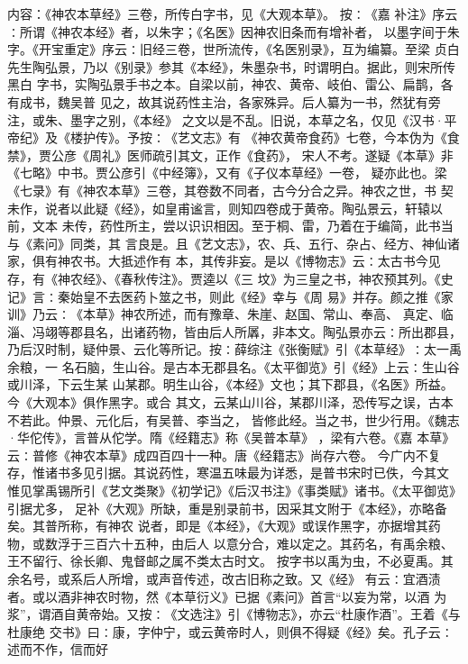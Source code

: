 \documentclass[12pt,UTF8]{ctexbook}
\begin{document}
内容：《神农本草经》三卷，所传白字书，见《大观本草》。 
按∶《嘉 补注》序云∶所谓《神农本经》者，以朱字；《名医》因神农旧条而有增补者， 
以墨字间于朱字。《开宝重定》序云∶旧经三卷，世所流传，《名医别录》，互为编纂。至梁 
贞白先生陶弘景，乃以《别录》参其《本经》，朱墨杂书，时谓明白。据此，则宋所传黑白 
字书，实陶弘景手书之本。自梁以前，神农、黄帝、岐伯、雷公、扁鹊，各有成书，魏吴普 
见之，故其说药性主治，各家殊异。后人纂为一书，然犹有旁注，或朱、墨字之别，《本经》 
之文以是不乱。旧说，本草之名，仅见《汉书·平帝纪》及《楼护传》。予按∶《艺文志》有 
《神农黄帝食药》七卷，今本伪为《食禁》，贾公彦《周礼》医师疏引其文，正作《食药》， 
宋人不考。遂疑《本草》非《七略》中书。贾公彦引《中经簿》，又有《子仪本草经》一卷， 
疑亦此也。梁《七录》有《神农本草》三卷，其卷数不同者，古今分合之异。神农之世，书 
契未作，说者以此疑《经》，如皇甫谧言，则知四卷成于黄帝。陶弘景云，轩辕以前，文本 
未传，药性所主，尝以识识相因。至于桐、雷，乃着在于编简，此书当与《素问》同类，其 
言良是。且《艺文志》，农、兵、五行、杂占、经方、神仙诸家，俱有神农书。大抵述作有 
本，其传非妄。是以《博物志》云∶太古书今见存，有《神农经》、《春秋传注》。贾逵以《三 
坟》为三皇之书，神农预其列。《史记》言∶秦始皇不去医药卜筮之书，则此《经》幸与《周 
易》并存。颜之推《家训》乃云∶《本草》神农所述，而有豫章、朱崖、赵国、常山、奉高、 
真定、临淄、冯翊等郡县名，出诸药物，皆由后人所羼，非本文。陶弘景亦云∶所出郡县， 
乃后汉时制，疑仲景、云化等所记。按∶薛综注《张衡赋》引《本草经》∶太一禹余粮，一 
名石脑，生山谷。是古本无郡县名。《太平御览》引《经》上云∶生山谷或川泽，下云生某 
山某郡。明生山谷，《本经》文也；其下郡县，《名医》所益。今《大观本》俱作黑字。或合 
其文，云某山川谷，某郡川泽，恐传写之误，古本不若此。仲景、元化后，有吴普、李当之， 
皆修此经。当之书，世少行用。《魏志·华佗传》，言普从佗学。隋《经籍志》称《吴普本草》 
，梁有六卷。《嘉 本草》云∶普修《神农本草》成四百四十一种。唐《经籍志》尚存六卷。 
今广内不复存，惟诸书多见引据。其说药性，寒温五味最为详悉，是普书宋时已佚，今其文 
惟见掌禹锡所引《艺文类聚》《初学记》《后汉书注》《事类赋》诸书。《太平御览》引据尤多， 
足补《大观》所缺，重是别录前书，因采其文附于《本经》，亦略备矣。其普所称，有神农 
说者，即是《本经》，《大观》或误作黑字，亦据增其药物，或数浮于三百六十五种，由后人 
以意分合，难以定之。其药名，有禹余粮、王不留行、徐长卿、鬼督邮之属不类太古时文。 
按字书以禹为虫，不必夏禹。其余名号，或系后人所增，或声音传述，改古旧称之致。又《经》 
有云∶宜酒渍者。或以酒非神农时物，然《本草衍义》已据《素问》首言“以妄为常，以酒 
为浆”，谓酒自黄帝始。又按∶《文选注》引《博物志》，亦云“杜康作酒”。王着《与杜康绝 
交书》曰∶康，字仲宁，或云黄帝时人，则俱不得疑《经》矣。孔子云∶述而不作，信而好 
\end{document}
